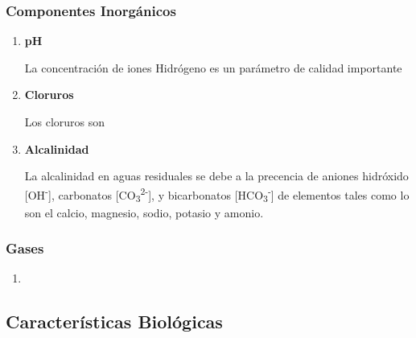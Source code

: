 \subsubsection{Componentes Inorgánicos}
\begin{enumerate}[label=\textbf{\alph*{.-}}]
	\item \textbf{pH}\par 
	La concentración de iones Hidrógeno es un parámetro de calidad importante
	\item \textbf{Cloruros}\par 
	Los cloruros son
	\item \textbf{Alcalinidad}\par
	La alcalinidad en aguas residuales se debe a la precencia de aniones hidróxido [OH\textsuperscript{-}], carbonatos [CO\textsubscript{3}\textsuperscript{2-}], y bicarbonatos [HCO\textsubscript{3}\textsuperscript{-}] de elementos tales como lo son el calcio, magnesio, sodio, potasio y amonio.
\end{enumerate}
\subsubsection{Gases}
\begin{enumerate}[label=\textbf{\alph*{.-}}]
	\item 
\end{enumerate}
\subsection{Características Biológicas}
